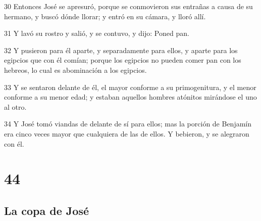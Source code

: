 \par 30 Entonces José se apresuró, porque se conmovieron sus entrañas a causa de su hermano, y buscó dónde llorar; y entró en su cámara, y lloró allí.
\par 31 Y lavó su rostro y salió, y se contuvo, y dijo: Poned pan.
\par 32 Y pusieron para él aparte, y separadamente para ellos, y aparte para los egipcios que con él comían; porque los egipcios no pueden comer pan con los hebreos, lo cual es abominación a los egipcios.
\par 33 Y se sentaron delante de él, el mayor conforme a su primogenitura, y el menor conforme a su menor edad; y estaban aquellos hombres atónitos mirándose el uno al otro.
\par 34 Y José tomó viandas de delante de sí para ellos; mas la porción de Benjamín era cinco veces mayor que cualquiera de las de ellos. Y bebieron, y se alegraron con él.

\chapter{44}

\section*{La copa de José}

